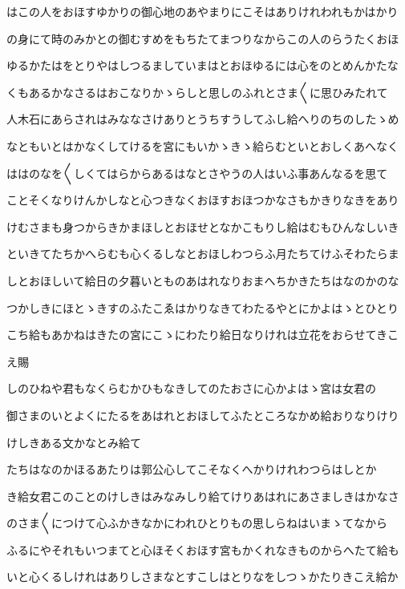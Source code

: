 \documentclass[a4paper,11pt,landscape]{ltjtarticle}
\begin{document}
はこの人をおほすゆかりの御心地のあやまりにこそはありけれわれもかはかり
\par\medskip
の身にて時のみかとの御むすめをもちたてまつりなからこの人のらうたくおほ
\par\medskip
ゆるかたはをとりやはしつるましていまはとおほゆるには心をのとめんかたな
\par\medskip
くもあるかなさるはおこなりかゝらしと思しのふれとさま〱に思ひみたれて
\par\medskip
人木石にあらされはみななさけありとうちすうしてふし給へりのちのしたゝめ
\par\medskip
なともいとはかなくしてけるを宮にもいかゝきゝ給らむといとおしくあへなく
\par\medskip
ははのなを〱しくてはらからあるはなとさやうの人はいふ事あんなるを思て
\par\medskip
ことそくなりけんかしなと心つきなくおほすおほつかなさもかきりなきをあり
\par\medskip
けむさまも身つからきかまほしとおほせとなかこもりし給はむもひんなしいき
\par\medskip
といきてたちかへらむも心くるしなとおほしわつらふ月たちてけふそわたらま
\par\medskip
しとおほしいて給日の夕暮いとものあはれなりおまへちかきたちはなのかのな
\par\medskip
つかしきにほとゝきすのふたこゑはかりなきてわたるやとにかよはゝとひとり
\par\medskip
こち給もあかねはきたの宮にこゝにわたり給日なりけれは立花をおらせてきこ
\par\medskip
え賜
\par\medskip
しのひねや君もなくらむかひもなきしてのたおさに心かよはゝ宮は女君の
\par\medskip
御さまのいとよくにたるをあはれとおほしてふたところなかめ給おりなりけり
\par\medskip
けしきある文かなとみ給て
\par\medskip
たちはなのかほるあたりは郭公心してこそなくへかりけれわつらはしとか
\par\medskip
き給女君このことのけしきはみなみしり給てけりあはれにあさましきはかなさ
\par\medskip
のさま〱につけて心ふかきなかにわれひとりもの思しらねはいまゝてなから
\par\medskip
ふるにやそれもいつまてと心ほそくおほす宮もかくれなきものからへたて給も
\par\medskip
いと心くるしけれはありしさまなとすこしはとりなをしつゝかたりきこえ給か
\par\medskip
\end{document}
